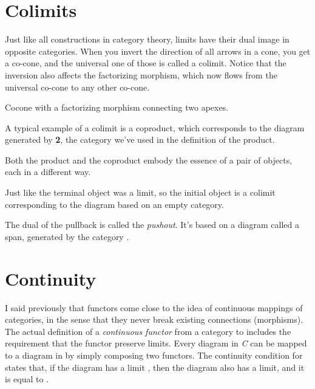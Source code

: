 \section{Colimits}\label{colimits}

Just like all constructions in category theory, limits have their dual
image in opposite categories. When you invert the direction of all
arrows in a cone, you get a co-cone, and the universal one of those is
called a colimit. Notice that the inversion also affects the factorizing
morphism, which now flows from the universal co-cone to any other
co-cone.

\begin{figure}[H]
\centering
{}
\end{figure}

\noindent
Cocone with a factorizing morphism  connecting two apexes.

A typical example of a colimit is a coproduct, which corresponds to the
diagram generated by \textbf{2}, the category we've used in the
definition of the product.

\begin{figure}[H]
\centering
{}
\end{figure}

\noindent
Both the product and the coproduct embody the essence of a pair of
objects, each in a different way.

Just like the terminal object was a limit, so the initial object is a
colimit corresponding to the diagram based on an empty category.

The dual of the pullback is called the \emph{pushout}. It's based on a
diagram called a span, generated by the category
.

\section{Continuity}\label{continuity}

I said previously that functors come close to the idea of continuous
mappings of categories, in the sense that they never break existing
connections (morphisms). The actual definition of a \emph{continuous
functor}  from a category  to  includes the
requirement that the functor preserve limits. Every diagram 
in \emph{C} can be mapped to a diagram  in  by
simply composing two functors. The continuity condition for 
states that, if the diagram  has a limit , then
the diagram  also has a limit, and it is equal to
.

